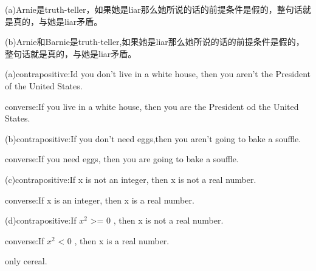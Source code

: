 \documentclass[a4paper, justified]{tufte-handout}
\begin{document}
\begin{problem}
\end{problem}

\begin{solution}

  (a)Arnie是truth-teller，如果她是liar那么她所说的话的前提条件是假的，整句话就是真的，与她是liar矛盾。

  (b)Arnie和Barnie是truth-teller,如果她是liar那么她所说的话的前提条件是假的，整句话就是真的，与她是liar矛盾。
\end{solution}

\begin{problem}
\end{problem}

\begin{solution}

  (a)contrapositive:Id you don't live in a white house, then you aren't the President of the United States.

  converse:If you live in a white house, then you are the President od the United States.

  (b)contrapositive:If you don't need eggs,then you aren't going to bake a souffle.

  converse:If you need eggs, then you are going to bake a souffle.

  (c)contrapositive:If x is not an integer, then x is not a real number.

  converse:If x is an integer, then x is a real number.

  (d)contrapositive:If $x^2$ >= 0 , then x is not  a real number.

  converse:If $x^2$ < 0 , then x is a real number.
\end{solution}

\begin{problem}
\end{problem}

\begin{solution}
  only cereal.
\end{solution}

\begin{problem}
\end{problem}
\end{document}
